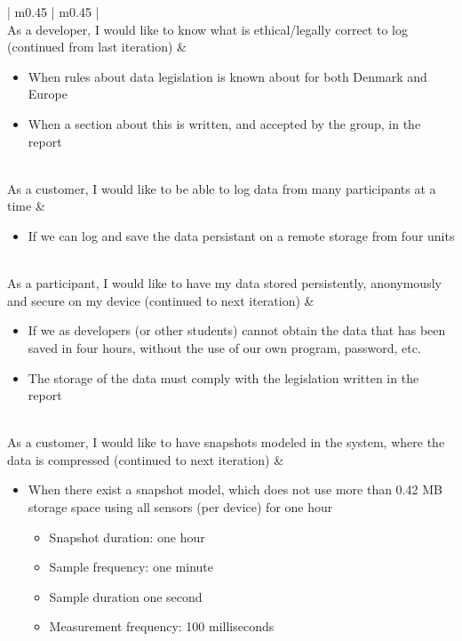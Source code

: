 \begin{center}
\begin{longtable}{| m{} | m{} |}
	 \\ \hline
	As a developer, I would like to know what is ethical/legally correct to log (continued from last iteration) & 
	\begin{itemize}[noitemsep,topsep=0pt,parsep=0pt,partopsep=0pt]
		\item When rules about data legislation is known about for both Denmark and Europe
		\item When a section about this is written, and accepted by the group, in the report
	\end{itemize} \\ \hline
	As a customer, I would like to be able to log data from many participants at a time & 
	\begin{itemize}[noitemsep,topsep=0pt,parsep=0pt,partopsep=0pt]
	 	\item If we can log and save the data persistant on a remote storage from four units
	 \end{itemize} \\ \hline
	As a participant, I would like to have my data stored persistently, anonymously and secure on my device (continued to next iteration)  & 
	\begin{itemize}[noitemsep,topsep=0pt,parsep=0pt,partopsep=0pt]
	 	\item If we as developers (or other students) cannot obtain the data that has been saved in four hours, without the use of our own program, password, etc.
	 	\item The storage of the data must comply with the legislation written in the report
	 \end{itemize} \\ \hline
	As a customer, I would like to have snapshots modeled in the system, where the data is compressed (continued to next iteration) & 
	\begin{itemize}[noitemsep,topsep=0pt,parsep=0pt,partopsep=0pt]
		\item When there exist a snapshot model, which does not use more than 0.42 MB storage space using all sensors (per device) for one hour
			\begin{itemize}[noitemsep,topsep=0pt,parsep=0pt,partopsep=0pt]
				\item Snapshot duration: one hour
				\item Sample frequency: one minute
				\item Sample duration one second
				\item Measurement frequency: 100 milliseconds
			\end{itemize}
	 \end{itemize} \\ \hline


\end{longtable}
\end{center}
